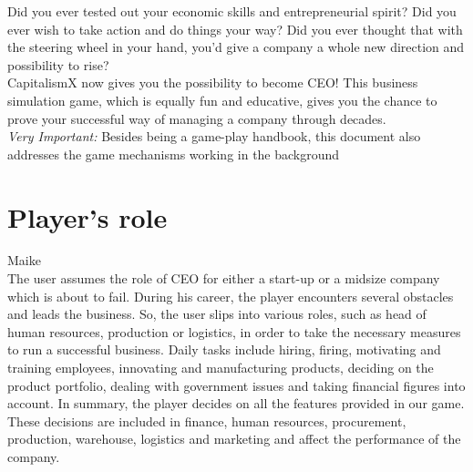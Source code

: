 \documentclass[11pt,titlepage,oneside,openany]{book}
\begin{document}
Did you ever tested out your economic skills and entrepreneurial spirit? Did you ever wish to take action and do things your way? Did you ever thought that with the steering wheel in your hand, you'd give a company a whole new direction and possibility to rise? \\
CapitalismX now gives you the possibility to become CEO! This business simulation game, which is equally fun and educative, gives you the chance to prove your successful way of managing a company through decades.\\

\emph{Very Important:} Besides being a game-play handbook, this document also addresses the game mechanisms working in the background
 
\section{Player's role}
Maike\\
The user assumes the role of CEO for either a start-up or a midsize company which is about to fail. During his career, the player encounters several obstacles and leads the business. So, the user slips into various roles, such as head of human resources, production or logistics, in order to take the necessary measures to run a successful business. Daily tasks include hiring, firing, motivating and training employees, innovating and manufacturing products, deciding on the product portfolio, dealing with government issues and taking financial figures into account.
In summary, the player decides on all the features provided in our game. These decisions are included in finance, human resources, procurement, production, warehouse, logistics and marketing and affect the performance of the company.
\end{document}
